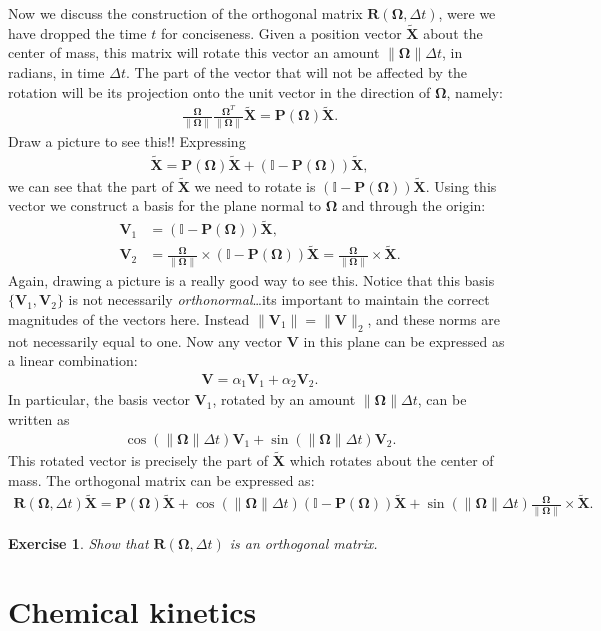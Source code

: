 \documentclass[10pt]{article}
\newtheorem{myexer}{Exercise}
\newcommand{\bs}[1]{{\boldsymbol #1}}
\begin{document}
Now we discuss the construction of the orthogonal matrix ${\bs R}({\bs \Omega}, \Delta t)$, were we have dropped the time $t$ for conciseness.  Given a position vector $\tilde{{\bs X}}$ about the center of mass, this matrix will rotate this vector an amount $\|{\bs \Omega}\|\Delta t$, in radians, in time $\Delta t$.  The part of the vector that will not be affected by the rotation will be its projection onto the unit vector in the direction of ${\bs \Omega}$, namely:
\begin{align*}
\frac{{\bs \Omega}}{\|{\bs \Omega}\|} \frac{{\bs \Omega}^T}{\|{\bs \Omega}\|} \tilde{\bs X} = {\bs P}({\bs \Omega}) \tilde{\bs X}.
\end{align*} 
Draw a picture to see this!!  Expressing
\begin{align*}
\tilde{\bs X} = {\bs P}({\bs \Omega}) \tilde{\bs X} + (\mathbb{I} - {\bs P}({\bs \Omega})) \tilde{\bs X},
\end{align*}
we can see that the part of $\tilde{\bs X}$ we need to rotate is $(\mathbb{I} - {\bs P}({\bs \Omega})) \tilde{\bs X}.$  Using this vector we construct a basis for the plane normal to ${\bs \Omega}$ and through the origin:
\begin{align*}
{\bs V}_1 &=  (\mathbb{I} - {\bs P}({\bs \Omega})) \tilde{\bs X}, \\
{\bs V}_2 &=  \frac{{\bs \Omega}}{\|{\bs \Omega}\|} \times (\mathbb{I} - {\bs P}({\bs \Omega})) \tilde{\bs X} = \frac{{\bs \Omega}}{\|{\bs \Omega}\|} \times \tilde{\bs X}. 
\end{align*}
Again, drawing a picture is a really good way to see this.  Notice that this basis $\{{\bs V}_1, {\bs V}_2\}$ is not necessarily {\em orthonormal}\ldots its important to maintain the correct magnitudes of the vectors here.  Instead $\|{\bs V}_1\| = \|{\bs V}\|_2$, and these norms are not necessarily equal to one.  Now any vector ${\bs V}$ in this plane can be expressed as a linear combination:
\begin{align*}
{\bs V} = \alpha_1 {\bs V}_1 + \alpha_2 {\bs V}_2.
\end{align*}
In particular, the basis vector ${\bs V}_1$, rotated by an amount $\|{\bs \Omega}\|\Delta t$, can be written as 
\begin{align*}
 \cos(\|{\bs \Omega}\|\Delta t){\bs V}_1 + \sin(\|{\bs \Omega}\|\Delta t){\bs V}_2. 
\end{align*}
This rotated vector is precisely the part of $\tilde{\bs X}$ which  rotates about the center of mass.  The orthogonal matrix can be expressed as:
\begin{align*}
{\bs R}({\bs \Omega}, \Delta t) \tilde{\bs X} = {\bs P}({\bs \Omega}) \tilde{\bs X} +  \cos(\|{\bs \Omega}\|\Delta t) (\mathbb{I} - {\bs P}({\bs \Omega})) \tilde{\bs X} + \sin(\|{\bs \Omega}\|\Delta t) \frac{{\bs \Omega}}{\|{\bs \Omega}\|} \times \tilde{\bs X}.
\end{align*}
\begin{myexer}
Show that ${\bs R}({\bs \Omega}, \Delta t)$ is an orthogonal matrix.
\end{myexer}

\newpage
\section{Chemical kinetics}
\end{document}

